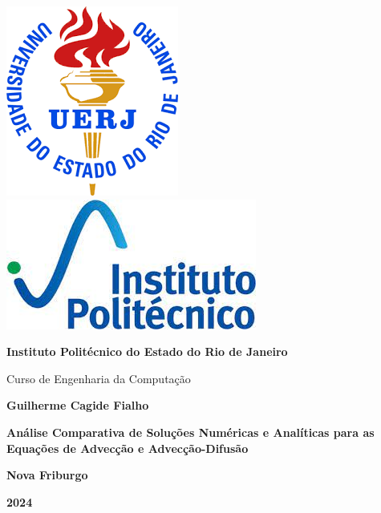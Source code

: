 \begin{titlepage}
    \centering

    \includegraphics[height=0.151\textwidth]{header/contra-capa/assets/uerj.png}\hfill
    \includegraphics[height=0.15\textwidth]{header/contra-capa/assets/iprj.jpeg}\hfill

    \vspace{2cm} %

    {\Large\bfseries Instituto Politécnico do Estado do Rio de Janeiro \par}
    \vspace{0.5cm}
    {\large Curso de Engenharia da Computação \par}

    \vspace{3cm} %

    {\large\bfseries Guilherme Cagide Fialho \par}

    \vspace{3cm}

    {\large\bfseries Análise Comparativa de Soluções Numéricas e Analíticas para as Equações de Advecção e Advecção-Difusão \par}

    \vfill %

    {\large\bfseries Nova Friburgo \par}
    \vspace{0.3cm}
    {\large\bfseries 2024 \par}
\end{titlepage}
\newpage %
